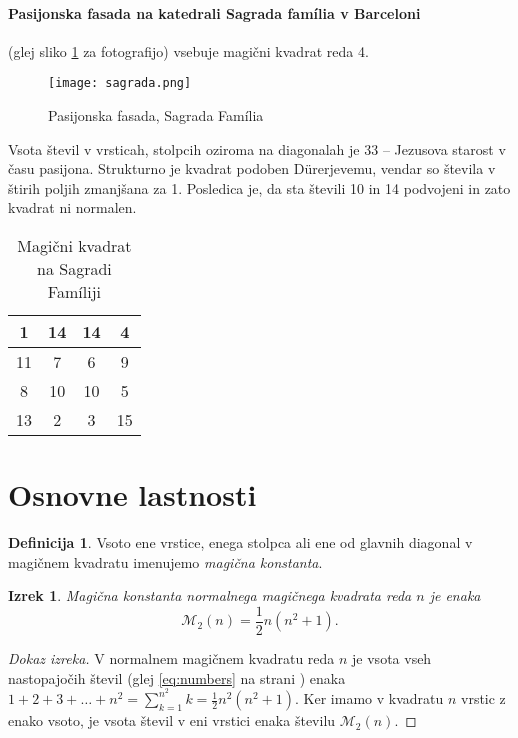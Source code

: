\documentclass[a4paper,12pt]{article}
\newcommand{\m}{\mathcal{M}_2}
\newcommand{\pojem}[1]{\emph{\color{purple}#1}}
\theoremstyle{definition}
\newtheorem{definicija}{Definicija}
\theoremstyle{plain}
\newtheorem{izrek}{Izrek}
\newenvironment{dokaz}{%
	\begin{proof}[Dokaz izreka]%
}{%
	\end{proof}%
}
\newenvironment{magic}[3]
{
   \begin{table}[!ht]
      \centering
      \caption{#2}
      \label{#3}
      \large
      \begin{tabular}{|*{#1}{c|}}
      \hline
}
{
      \end{tabular}
      \normalsize
   \end{table}
}
\begin{document}
\paragraph{Pasijonska fasada na katedrali Sagrada família v Barceloni}
(glej sliko \ref{fig:sagrada} za fotografijo) vsebuje magični kvadrat reda 4.
%
\begin{figure}[!ht]
   \centering
   \caption{Pasijonska fasada, Sagrada Família}
   \label{fig:sagrada}
   \texttt{[image: sagrada.png]}
\end{figure}

Vsota števil v vrsticah, stolpcih oziroma na diagonalah je 33 -- Jezusova starost
v času pasijona. Strukturno je kvadrat podoben Dürerjevemu, vendar so števila
v štirih poljih zmanjšana za 1. Posledica je, da sta števili 10 in 14 podvojeni
in zato kvadrat ni normalen.
% 
\begin{magic}{4}{Magični kvadrat na Sagradi Famíliji}{table:sagrada}
   1 & 14 & 14 &  4 \\\hline
  11 &  7 &  6 &  9 \\\hline
   8 & 10 & 10 &  5 \\\hline
  13 &  2 &  3 & 15 \\\hline
\end{magic}


\section{Osnovne lastnosti}

\begin{definicija}
   Vsoto ene vrstice, enega stolpca ali ene od glavnih diagonal
   v magičnem kvadratu imenujemo \pojem{magična konstanta}.
\end{definicija}

\begin{izrek}
   Magična konstanta normalnega magičnega kvadrata reda $n$
   je enaka
   \begin{equation}
      \label{eq:mc}
      \m(n) = \frac{1}{2} n(n^2+1).
   \end{equation}
\end{izrek}

\begin{dokaz}
   V normalnem magičnem kvadratu reda $n$ je vsota vseh nastopajočih
   števil (glej \eqref{eq:numbers} na strani \pageref{eq:numbers}) enaka
   $1+2+3+\dots+n^2=\sum_{k=1}^{n^2}k=\frac{1}{2}n^2(n^2+1)$. Ker imamo
   v kvadratu $n$ vrstic z enako vsoto, je vsota števil v eni vrstici
   enaka številu $\m(n)$.
\end{dokaz}
\end{document}
